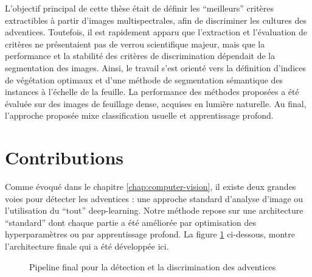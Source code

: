 \documentclass[../thesis.tex]{subfiles}
\begin{document}
    
    L'objectif principal de cette thèse était de définir les ``meilleurs'' critères extractibles à partir d'images multispectrales, afin de discriminer les cultures des adventices. Toutefois, il est rapidement apparu que l'extraction et l'évaluation de critères ne présentaient pas de verrou scientifique majeur, mais que la performance et la stabilité des critères de discrimination dépendait de la segmentation des images. Ainsi, le travail s'est orienté vers la définition d'indices de végétation optimaux et d'une méthode de segmentation sémantique des instances à l'échelle de la feuille. La performance des méthodes proposées a été évaluée sur des images de feuillage dense, acquises en lumière naturelle. Au final, l'approche proposée mixe classification usuelle et apprentissage profond. 
    
    \newpage
    \section{Contributions}
    
    Comme évoqué dans le chapitre \ref{chap:computer-vision}, il existe deux grandes voies pour détecter les adventices : une approche standard d'analyse d'image ou l'utilisation du ``tout'' deep-learning. Notre méthode repose sur une architecture ``standard'' dont chaque partie a été améliorée par optimisation des hyperparamètres ou par apprentissage profond. La figure \ref{fig:09-global-view} ci-dessous, montre l'architecture finale qui a été développée ici.
    
    \begin{figure}[H]
        \centering
        \vspace{-2em}
        
        \caption{Pipeline final pour la détection et la discrimination des adventices}
        \label{fig:09-global-view}
    \end{figure}
    
\end{document}
